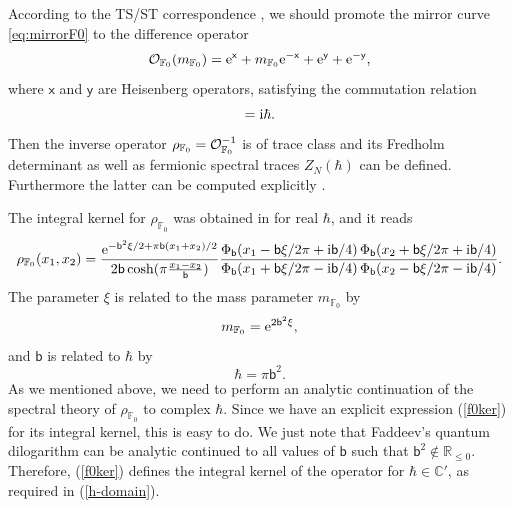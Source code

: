 \documentclass[a4paper,11pt]{article}
\theoremstyle{definition}
\newcommand{\CO}{{\cal O}}
\def\IR{{\mathbb R}}
\def\IC{{\mathbb C}}
\def\IF{{\mathbb F}}
\newcommand{\re}{{\rm e}}
\newcommand{\ri}{{\rm i}}
\newcommand{\mb}{\mathsf{b}}
\newcommand{\bb}{\mathsf{b}}
\newcommand{\fad}{\operatorname{\Phi}_{\mathsf{b}}}
\def\ms{\mathsf}
\begin{document}
According to the TS/ST correspondence \cite{ghm,cgm}, we should
promote the mirror curve \eqref{eq:mirrorF0} to the difference
operator
%
\begin{equation}
  \CO_{\IF_0}(m_{\IF_0}) = \re^{\ms{x}} + m_{\IF_0} \re^{-\ms{x}} +
  \re^{\ms{y}} + \re^{-\ms{y}},
\end{equation}
%
where $\ms{x}$ and $\ms{y}$ are Heisenberg operators, satisfying the commutation
relation
\begin{equation}
  [\ms{x}, \ms{y}] = \ri\hbar.
\end{equation}
Then the inverse operator $\rho_{\IF_0} = \CO_{\IF_0}^{-1}$ is of
trace class \cite{kama} and its Fredholm determinant as well as
fermionic spectral traces $Z_N(\hbar)$ can be defined.  Furthermore
the latter can be computed explicitly \cite{kmz}.

The integral kernel for $\rho_{\IF_0}$ was obtained in \cite{kmz} for real $\hbar$, and it reads
%
\begin{equation}
  \label{f0ker}
  \rho_{\IF_0}(x_1, x_2)
  = \frac{\re^{- \mathsf{b}^2 \xi /2+\pi\bb(x_1+x_2)/2}}
  {2\bb\cosh(\pi\frac{x_1-x_2}{\bb})}
  \frac{\fad(x_1-\bb\xi/2\pi+\ri\bb/4)\fad(x_2+\bb\xi/2\pi+\ri\bb/4)}
  {\fad(x_1+\bb\xi/2\pi-\ri\bb/4)\fad(x_2-\bb\xi/2\pi-\ri\bb/4)}.
\end{equation} 
%
The parameter $\xi$ is related to the mass parameter $m_{\IF_0}$ by
%
\begin{equation}
  \label{mmu}
  m_{\IF_0}=\re^{2 \mathsf{b}^2 \xi},
\end{equation}
%
and $\mb$ is related to $\hbar$ by
%
\begin{equation}
  \hbar = \pi \bb^2. 
\end{equation}
%
As we mentioned above, we need to perform an analytic continuation of the spectral theory of $\rho_{\IF_0}$ to complex $\hbar$. Since we have an explicit expression (\ref{f0ker}) for its integral kernel, this is easy to do. We just note that Faddeev's quantum dilogarithm can be analytic continued to all values of $\bb$ such that $\bb^2 \notin \IR_{\le 0}$. Therefore, (\ref{f0ker}) defines the integral kernel of the operator for $\hbar \in \IC'$, as required in (\ref{h-domain}). 
\end{document}
